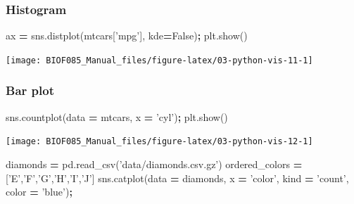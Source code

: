 \documentclass[
  letterpaper,
]{scrbook}
\newenvironment{Shaded}{\begin{snugshade}}{\end{snugshade}}
\newcommand{\NormalTok}[1]{#1}
\newcommand{\OperatorTok}[1]{\textcolor[rgb]{0.81,0.36,0.00}{\textbf{#1}}}
\newcommand{\StringTok}[1]{\textcolor[rgb]{0.31,0.60,0.02}{#1}}
\newcommand{\VariableTok}[1]{\textcolor[rgb]{0.00,0.00,0.00}{#1}}
\begin{document}
\hypertarget{histogram-1}{%
\subsubsection{Histogram}\label{histogram-1}}

\begin{Shaded}
\begin{Highlighting}[]
\NormalTok{ax }\OperatorTok{=}\NormalTok{ sns.distplot(mtcars[}\StringTok{'mpg'}\NormalTok{], kde}\OperatorTok{=}\VariableTok{False}\NormalTok{)}\OperatorTok{;}
\NormalTok{plt.show()}
\end{Highlighting}
\end{Shaded}

\begin{center}\texttt{[image: BIOF085\_Manual\_files/figure-latex/03-python-vis-11-1]} \end{center}

\hypertarget{bar-plot-1}{%
\subsubsection{Bar plot}\label{bar-plot-1}}

\begin{Shaded}
\begin{Highlighting}[]
\NormalTok{sns.countplot(data }\OperatorTok{=}\NormalTok{ mtcars, x }\OperatorTok{=} \StringTok{'cyl'}\NormalTok{)}\OperatorTok{;}
\NormalTok{plt.show()}
\end{Highlighting}
\end{Shaded}

\begin{center}\texttt{[image: BIOF085\_Manual\_files/figure-latex/03-python-vis-12-1]} \end{center}

\begin{Shaded}
\begin{Highlighting}[]
\NormalTok{diamonds }\OperatorTok{=}\NormalTok{ pd.read_csv(}\StringTok{'data/diamonds.csv.gz'}\NormalTok{)}
\NormalTok{ordered_colors }\OperatorTok{=}\NormalTok{ [}\StringTok{'E'}\NormalTok{,}\StringTok{'F'}\NormalTok{,}\StringTok{'G'}\NormalTok{,}\StringTok{'H'}\NormalTok{,}\StringTok{'I'}\NormalTok{,}\StringTok{'J'}\NormalTok{]}
\NormalTok{sns.catplot(data }\OperatorTok{=}\NormalTok{ diamonds, x }\OperatorTok{=} \StringTok{'color'}\NormalTok{, kind }\OperatorTok{=} \StringTok{'count'}\NormalTok{, color }\OperatorTok{=} \StringTok{'blue'}\NormalTok{)}\OperatorTok{;}
\end{Highlighting}
\end{Shaded}
\end{document}
